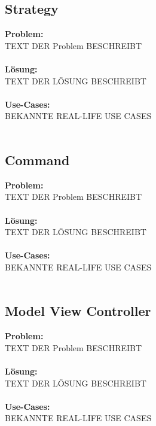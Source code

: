 \documentclass[../main.tex]{subfiles}
\begin{document}
	\subsection{Strategy}
	\textbf{Problem:}\\
	TEXT DER Problem BESCHREIBT\\\\
	\textbf{Lösung:}\\
	TEXT DER LÖSUNG BESCHREIBT\\\\
	\textbf{Use-Cases:}\\
	BEKANNTE REAL-LIFE USE CASES\\\\
	\clearpage
	
	\subsection{Command}
	\textbf{Problem:}\\
	TEXT DER Problem BESCHREIBT\\\\
	\textbf{Lösung:}\\
	TEXT DER LÖSUNG BESCHREIBT\\\\
	\textbf{Use-Cases:}\\
	BEKANNTE REAL-LIFE USE CASES\\\\
	\clearpage
	
	\subsection{Model View Controller}
	\textbf{Problem:}\\
	TEXT DER Problem BESCHREIBT\\\\
	\textbf{Lösung:}\\
	TEXT DER LÖSUNG BESCHREIBT\\\\
	\textbf{Use-Cases:}\\
	BEKANNTE REAL-LIFE USE CASES\\\\
	\clearpage
\end{document}
